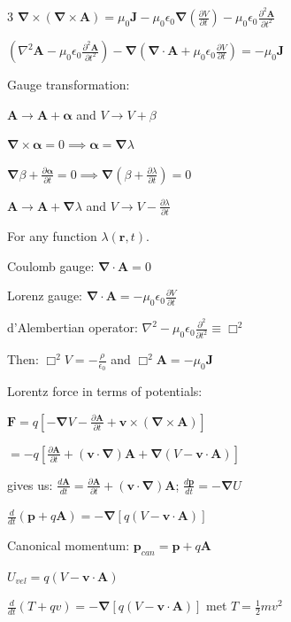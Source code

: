 \documentclass[a4paper,twoside]{article}
\begin{document}
\begin{multicols*}{3}
\(\bm \nabla \times (\bm \nabla \times \bm A)= \mu_0 \bm J - \mu_0 \epsilon_0 \bm \nabla \left(\frac{\partial V }{\partial t}\right) - \mu_0 \epsilon_0 \frac{\partial^2 \bm A}{\partial t^2}\)

\( ( \nabla^2 \bm A - \mu_0 \epsilon_0 \frac{\partial^2 \bm A}{\partial t^2} )
- \bm \nabla (\bm \nabla \cdot \bm A + \mu_0 \epsilon_0 \frac{\partial V}{\partial t} )
= -\mu_0 \bm J\)

Gauge transformation:

\(\bm A \to \bm A + \bm \alpha\) and \(V \to V + \beta\)

\(\bm \nabla \times \bm\alpha = 0 \implies \bm \alpha = \bm \nabla \lambda\)

\(\bm \nabla \beta + \frac{\partial \bm \alpha}{\partial t} = 0 \implies\bm \nabla (\beta + \frac{\partial \lambda}{\partial t})=0\)

\(\bm A \to \bm A + \bm \nabla \lambda\) and \(V \to V - \frac{\partial \lambda}{\partial t}\)

For any function \(\lambda(\bm r, t)\).

Coulomb gauge: \(\bm \nabla \cdot \bm A = 0\)

Lorenz gauge: \(\bm \nabla \cdot \bm A = -\mu_0 \epsilon_0 \frac{\partial V}{\partial t} \)

d'Alembertian operator:  \(\nabla^2 -\mu_0 \epsilon_0 \frac{\partial^2}{\partial t^2} \equiv \Box^2\)

Then:
\(\Box^2 V = -\frac{\rho}{\epsilon_0}\) and \(\Box^2 \bm A = -\mu_0 \bm J\)

Lorentz force in terms of potentials:

\(\bm F = q [ -\bm \nabla V - \frac{\partial \bm A}{\partial t} + \bm v \times (\bm \nabla \times \bm A)] \)

\(= -q[\frac{\partial \bm A}{\partial t} + (\bm v \cdot \bm \nabla) \bm A + \bm \nabla (V-\bm v \cdot \bm A)]\)

gives us:
\( \frac{d \bm A}{dt} = \frac{\partial \bm A}{\partial t} + (\bm v \cdot \bm \nabla) \bm A \);
\(\frac{d\bm p}{dt} = - \bm \nabla U\)

\(\frac{d}{dt}(\bm p + q \bm A) = - \bm \nabla [q(V-\bm v \cdot \bm A)]\)

Canonical momentum:
\(\bm p_{can} = \bm p + q \bm A\)

\(U_{vel} = q(V-\bm v \cdot \bm A)\)

\(\frac{d}{dt} (T + qv) = - \bm \nabla [q(V-\bm v \cdot \bm A)]\) met \(T = \frac{1}{2}mv^2\)


\end{multicols*}
\end{document}
